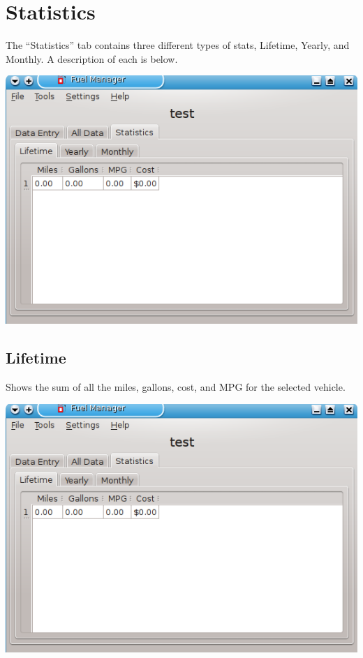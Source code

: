 \chapter{Statistics}
The ``Statistics'' tab contains three different types of stats, Lifetime, Yearly, and Monthly.
A description of each is below.
  \begin{center}
    \includegraphics{snapshot8}
  \end{center}

\section{Lifetime}
Shows the sum of all the miles, gallons, cost, and MPG for the selected vehicle.
  \begin{center}
    \includegraphics{snapshot8}
  \end{center}

